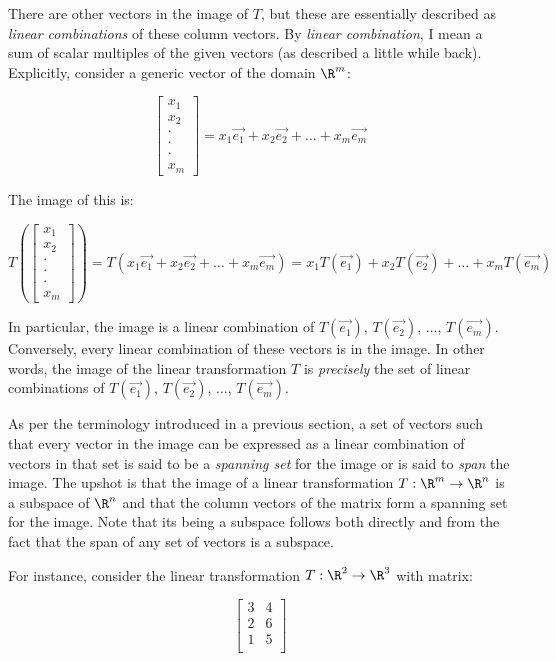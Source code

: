 \documentclass[10pt]{amsart}
\begin{document}
There are other vectors in the image of $T$, but these are essentially
described as {\em linear combinations} of these column vectors. By
{\em linear combination}, I mean a sum of scalar multiples of the
given vectors (as described a little while back). Explicitly, consider
a generic vector of the domain $\R^m$:

$$\left[\begin{matrix} x_1  \\ x_2 \\ \cdot \\ \cdot \\ \cdot \\ x_m \end{matrix}\right] = x_1 \vec{e_1} + x_2 \vec{e_2} + \dots + x_m \vec{e_m}$$

The image of this is:

$$T\left(\left[\begin{matrix} x_1  \\ x_2 \\ \cdot \\ \cdot \\ \cdot \\ x_m \end{matrix}\right]\right) = T(x_1 \vec{e_1} + x_2 \vec{e_2} + \dots + x_m \vec{e_m}) = x_1T(\vec{e_1}) + x_2T(\vec{e_2}) + \dots + x_mT(\vec{e_m})$$

In particular, the image is a linear combination of $T(\vec{e_1})$,
$T(\vec{e_2})$, $\dots$, $T(\vec{e_m})$. Conversely, every linear
combination of these vectors is in the image. In other words, the
image of the linear transformation $T$ is {\em precisely} the set of
linear combinations of $T(\vec{e_1})$, $T(\vec{e_2})$, $\dots$,
$T(\vec{e_m})$.

As per the terminology introduced in a previous section, a set of
vectors such that every vector in the image can be expressed as a
linear combination of vectors in that set is said to be a {\em
  spanning set} for the image or is said to {\em span} the image. The
upshot is that the image of a linear transformation $T:\R^m \to \R^n$
is a subspace of $\R^n$ and that the column vectors of the matrix form
a spanning set for the image. Note that its being a subspace follows
both directly and from the fact that the span of any set of vectors is
a subspace.

For instance, consider the linear transformation $T:\R^2 \to \R^3$
with matrix:

$$\left[\begin{matrix} 3 & 4 \\ 2 & 6\\ 1 & 5 \\\end{matrix}\right]$$
\end{document}
